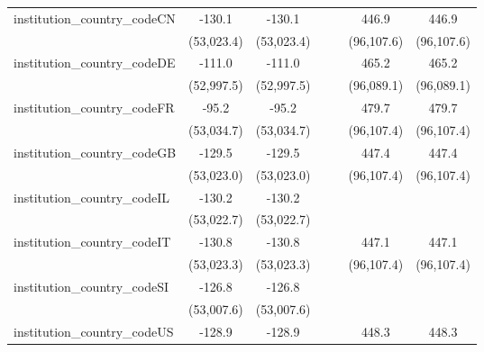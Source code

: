 \begin{tabular}{lcccccc}
   institution\_country\_codeCN          & -130.1        & -130.1        &               &               & 446.9         & 446.9\\   
                                         & (53,023.4)    & (53,023.4)    &               &               & (96,107.6)    & (96,107.6)\\   
   institution\_country\_codeDE          & -111.0        & -111.0        &               &               & 465.2         & 465.2\\   
                                         & (52,997.5)    & (52,997.5)    &               &               & (96,089.1)    & (96,089.1)\\   
   institution\_country\_codeFR          & -95.2         & -95.2         &               &               & 479.7         & 479.7\\   
                                         & (53,034.7)    & (53,034.7)    &               &               & (96,107.4)    & (96,107.4)\\   
   institution\_country\_codeGB          & -129.5        & -129.5        &               &               & 447.4         & 447.4\\   
                                         & (53,023.0)    & (53,023.0)    &               &               & (96,107.4)    & (96,107.4)\\   
   institution\_country\_codeIL          & -130.2        & -130.2        &               &               &               &   \\   
                                         & (53,022.7)    & (53,022.7)    &               &               &               &   \\   
   institution\_country\_codeIT          & -130.8        & -130.8        &               &               & 447.1         & 447.1\\   
                                         & (53,023.3)    & (53,023.3)    &               &               & (96,107.4)    & (96,107.4)\\   
   institution\_country\_codeSI          & -126.8        & -126.8        &               &               &               &   \\   
                                         & (53,007.6)    & (53,007.6)    &               &               &               &   \\   
   institution\_country\_codeUS          & -128.9        & -128.9        &               &               & 448.3         & 448.3\\   

\end{tabular}
